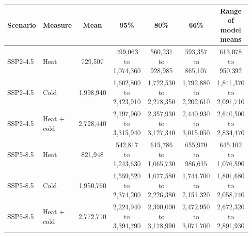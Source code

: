 \begin{tabular}{llccccc}
\toprule
Scenario & Measure & Mean & 95\% & 80\% & 66\% & Range of model means \\
\midrule
SSP2-4.5 & Heat & 729,507 & 499,063 to 1,074,360 & 560,231 to 928,985 & 593,357 to 865,107 & 613,078 to 950,392 \\
SSP2-4.5 & Cold & 1,998,940 & 1,602,800 to 2,423,910 & 1,722,530 to 2,278,350 & 1,792,880 to 2,202,610 & 1,841,370 to 2,091,710 \\
SSP2-4.5 & Heat + cold & 2,728,440 & 2,197,960 to 3,315,940 & 2,357,930 to 3,127,340 & 2,440,930 to 3,015,050 & 2,640,500 to 2,834,470 \\
SSP5-8.5 & Heat & 821,948 & 542,817 to 1,243,630 & 615,786 to 1,065,730 & 655,970 to 986,615 & 645,102 to 1,076,590 \\
SSP5-8.5 & Cold & 1,950,760 & 1,559,520 to 2,374,200 & 1,677,580 to 2,226,380 & 1,744,700 to 2,151,320 & 1,801,680 to 2,058,740 \\
SSP5-8.5 & Heat + cold & 2,772,710 & 2,224,940 to 3,394,790 & 2,390,000 to 3,178,990 & 2,472,950 to 3,071,700 & 2,672,320 to 2,891,930 \\
\bottomrule
\end{tabular}
